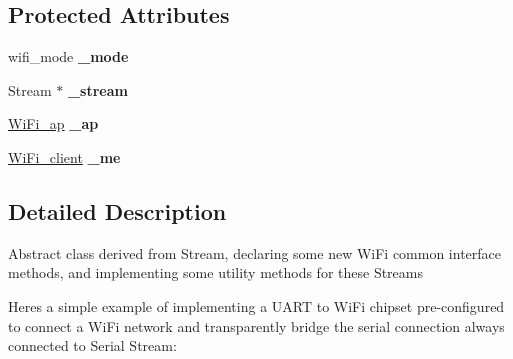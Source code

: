\subsection*{Protected Attributes}
\begin{DoxyCompactItemize}
\item 
\mbox{\label{classathome_1_1communication_1_1wifi_1_1_a_wi_fi_communicator_a857f4193bdf63fcfdddeaf43f945ed50}} 
wifi\+\_\+mode {\bfseries \+\_\+mode}
\item 
\mbox{\label{classathome_1_1communication_1_1wifi_1_1_a_wi_fi_communicator_a07a54c2f10295708f14d6a9069612f48}} 
Stream $\ast$ {\bfseries \+\_\+stream}
\item 
\mbox{\label{classathome_1_1communication_1_1wifi_1_1_a_wi_fi_communicator_a4d1d5dae7e80603205321585a8861bb8}} 
\mbox{\hyperlink{structathome_1_1communication_1_1wifi_1_1s__wifi__access__point}{Wi\+Fi\+\_\+ap}} {\bfseries \+\_\+ap}
\item 
\mbox{\label{classathome_1_1communication_1_1wifi_1_1_a_wi_fi_communicator_af249e6e9eff32fed22de39a5b7c62b49}} 
\mbox{\hyperlink{structathome_1_1communication_1_1wifi_1_1s__wifi__client}{Wi\+Fi\+\_\+client}} {\bfseries \+\_\+me}
\end{DoxyCompactItemize}


\subsection{Detailed Description}
Abstract class derived from Stream, declaring some new Wi\+Fi common interface methods, and implementing some utility methods for these {\ttfamily Stream}s

Here\textquotesingle{}s a simple example of implementing a U\+A\+RT to Wi\+Fi chipset pre-\/configured to connect a Wi\+Fi network and transparently bridge the serial connection always connected to Serial Stream\+:



